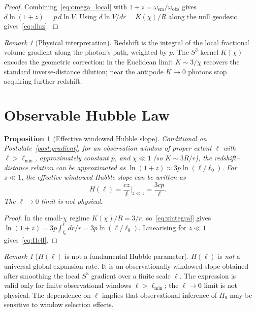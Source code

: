 \documentclass[12pt,a4paper]{amsart}
\theoremstyle{plain}
\newtheorem{proposition}[theorem]{Proposition}
\theoremstyle{definition}
\theoremstyle{remark}
\newtheorem{remark}[theorem]{Remark}
\newcommand{\Sthree}{S^3}
\newcommand{\Hzero}{H_0}
\begin{document}
\begin{proof}
  Combining~\eqref{eq:omega_local} with $1+z=\omega_{\mathrm{em}}/\omega_{\mathrm{obs}}$
  gives $d\ln(1+z)=p\,d\ln V$. Using $d\ln V/dr=K(\chi)/R$ along the
  null geodesic gives~\eqref{eq:dlnz}.
\end{proof}

\begin{remark}[Physical interpretation]
  Redshift is the integral of the local fractional volume gradient
  along the photon's path, weighted by $p$. The $\Sthree$ kernel
  $K(\chi)$ encodes the geometric correction: in the Euclidean limit
  $K\sim 3/\chi$ recovers the standard inverse-distance dilution; near
  the antipode $K\to 0$ photons stop acquiring further redshift.
\end{remark}

\section{Observable Hubble Law}
\label{sec:hubble}

\begin{proposition}[Effective windowed Hubble slope]
  \label{thm:Hwindow}
  \emph{Conditional on Postulate~\ref{post:gradient}}, for an
  observation window of proper extent $\ell$ with $\ell>\ell_{\min}$,
  approximately constant $p$, and $\chi\ll 1$ (so $K\sim 3R/r$),
  the redshift--distance relation can be approximated as
  $\ln(1+z)\approx 3p\ln(\ell/\ell_0)$. For $z\ll 1$, the
  effective windowed Hubble slope can be written as
  \begin{equation}
    \boxed{
      H(\ell) = \frac{cz}{\ell}\Big|_{z\ll 1} = \frac{3cp}{\ell}.
    }
    \label{eq:Hell}
  \end{equation}
  The $\ell\to 0$ limit is not physical.
\end{proposition}

\begin{proof}
  In the small-$\chi$ regime $K(\chi)/R=3/r$, so~\eqref{eq:zintegral}
  gives $\ln(1+z)=3p\int_{\ell_0}^\ell dr/r = 3p\ln(\ell/\ell_0)$.
  Linearising for $z\ll 1$ gives~\eqref{eq:Hell}.
\end{proof}

\begin{remark}[$H(\ell)$ is not a fundamental Hubble parameter]
  $H(\ell)$ is \emph{not} a universal global expansion rate. It is an
  observationally windowed slope obtained after smoothing the local
  $\Sthree$ gradient over a finite scale $\ell$. The expression is
  valid only for finite observational windows $\ell>\ell_{\min}$;
  the $\ell\to 0$ limit is not physical. The dependence on $\ell$
  implies that observational inference of $\Hzero$ may be sensitive
  to window selection effects.
\end{remark}
\end{document}
